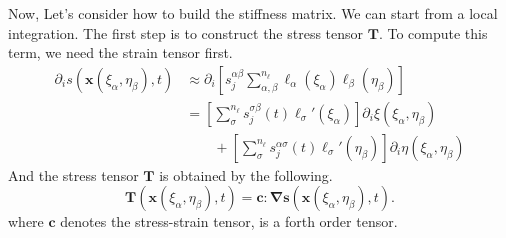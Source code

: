 \documentclass{article}
\begin{document}
Now, Let's consider how to build the stiffness matrix. We can start from a local integration. The first step is to construct the stress tensor $\boldsymbol T$. To compute this term, we need the strain tensor first. 
\begin{equation}
\begin{aligned}
 \partial_i s(\boldsymbol x(\xi_\alpha,\eta_\beta),t) &\approx \partial_i\left[s_j^{\alpha\beta}\sum_{\alpha,\beta}^{n_\ell}\ell_\alpha(\xi_\alpha)\ell_\beta(\eta_\beta)\right]\\
						 &= \left[\sum_\sigma^{n_\ell}s_j^{\sigma\beta}(t)\ell_\sigma'(\xi_\alpha)\right]\partial_i\xi(\xi_\alpha,\eta_\beta)\\
						 &\qquad +\left[\sum_\sigma^{n_\ell}s_j^{\alpha\sigma}(t)\ell_\sigma'(\eta_\beta)\right]\partial_i\eta(\xi_\alpha,\eta_\beta)
\end{aligned}
 \end{equation}
And the stress tensor $\boldsymbol T$ is obtained by the following.
\begin{equation}
 \boldsymbol T(\boldsymbol x(\xi_\alpha,\eta_\beta),t)=\boldsymbol c:\boldsymbol \nabla \boldsymbol s(\boldsymbol x(\xi_\alpha, \eta_\beta),t).
\end{equation}
where $\boldsymbol c$ denotes the stress-strain tensor, is a forth order tensor.












  
\end{document}

